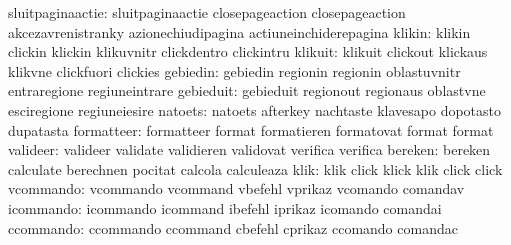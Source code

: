          sluitpaginaactie: sluitpaginaactie          closepageaction
                           closepageaction           akcezavrenistranky
                           azionechiudipagina        actiuneinchiderepagina %
                   klikin: klikin                    clickin
                           klickin                   klikuvnitr
                           clickdentro               clickintru
                  klikuit: klikuit                   clickout
                           klickaus                  klikvne
                           clickfuori                clickies
                 gebiedin: gebiedin                  regionin
                           regionin                  oblastuvnitr
                           entraregione              regiuneintrare
                gebieduit: gebieduit                 regionout
                           regionaus                 oblastvne
                           esciregione               regiuneiesire
                  natoets: natoets                   afterkey
                           nachtaste                 klavesapo
                           dopotasto                 dupatasta
               formatteer: formatteer                format
                           formatieren               formatovat
                           format                    format %
                 valideer: valideer                  validate
                           validieren                validovat
                           verifica                  verifica
                  bereken: bereken                   calculate
                           berechnen                 pocitat
                           calcola                   calculeaza
                     klik: klik                      click
                           klick                     klik
                           click                     click
                vcommando: vcommando                 vcommand
                           vbefehl                   vprikaz
                           vcomando                  comandav
                icommando: icommando                 icommand
                           ibefehl                   iprikaz
                           icomando                  comandai
                ccommando: ccommando                 ccommand
                           cbefehl                   cprikaz
                           ccomando                  comandac

\stopconstants


